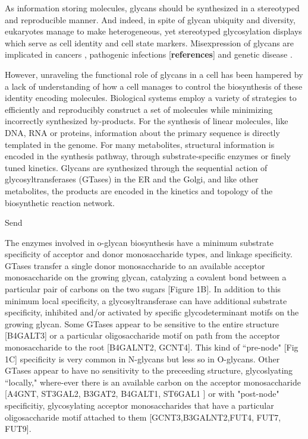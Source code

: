 \documentclass[twocolumn]{article}
\begin{document}
As information storing molecules, glycans should be synthesized in a stereotyped and reproducible manner. And indeed, in spite of glycan ubiquity and diversity, eukaryotes manage to make heterogeneous, yet stereotyped glycosylation displays which serve as cell identity and cell state markers. Misexpression of glycans are implicated in cancers \cite{Vankemmelbeke2016, Lloyd1996}, pathogenic infections [\textbf{references}] and genetic disease \cite{Freeze2011}.

However, unraveling the functional role of glycans in a cell has been hampered by a lack of understanding of how a cell manages to control the biosynthesis of these identity encoding molecules. Biological systems employ a variety of strategies to efficiently and reproducibly construct a set of molecules while minimizing incorrectly synthesized by-products. For the synthesis of linear molecules, like DNA, RNA or proteins, information about the primary sequence is directly templated in the genome. For many metabolites, structural information is encoded in the synthesis pathway, through substrate-specific enzymes or finely tuned kinetics. Glycans are synthesized through the sequential action of glycosyltransferases (GTases) in the ER and the Golgi, and like other metabolites, the products are encoded in the kinetics and topology of the biosynthetic reaction network.

Send	
 

The enzymes involved in o-glycan biosynthesis have a minimum substrate specificity of acceptor and donor monosaccharide types, and linkage specificity. GTases transfer a single donor monosaccharide to an available acceptor monosaccharide on the growing glycan, catalyzing a covalent bond between a particular pair of carbons on the two sugars [Figure 1B]. In addition to this minimum local specificity, a glycosyltransferase can have additional substrate specificity, inhibited and/or activated by specific glycodeterminant motifs on the growing glycan. Some GTases appear to be sensitive to the entire structure [B4GALT3] or a particular oligosaccharide motif on path from the acceptor monosaccharide to the root [B4GALNT2, GCNT4]. This kind of ``pre-node" [Fig 1C] specificity is very common in N-glycans but less so in O-glycans.  Other GTases appear to have no sensitivity to the preceeding structure, glycoslyating ``locally," where-ever there is an available carbon on the acceptor monosaccharide [A4GNT, ST3GAL2, B3GAT2, B4GALT1, ST6GAL1  \cite{Blixt2008}] or with "post-node" specificitiy, glycosylating acceptor monosaccharides that have a particular oligosaccharide motif attached to them [GCNT3,B3GALNT2,FUT4, FUT7, FUT9]. 
\end{document}
